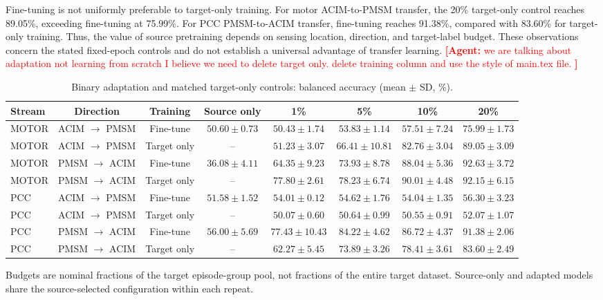 \documentclass[letterpaper,journal]{IEEEtran}
\newcommand{\agent}[1]{%
    \textcolor{red}{\textbf{[Agent:} #1\textbf{]}}%
}
\begin{document}
Fine-tuning is not uniformly preferable to target-only training. For motor ACIM-to-PMSM transfer, the 20\% target-only control reaches 89.05\%, exceeding fine-tuning at 75.99\%. For PCC PMSM-to-ACIM transfer, fine-tuning reaches 91.38\%, compared with 83.60\% for target-only training. Thus, the value of source pretraining depends on sensing location, direction, and target-label budget. These observations concern the stated fixed-epoch controls and do not establish a universal advantage of transfer learning.
\agent{we are talking about adaptation not learning from scratch
I believe we need to delete target only. delete training column and use the style of main.tex file. }
\begin{table}[t]
\centering
\footnotesize
\caption{Binary adaptation and matched target-only controls: balanced accuracy (mean $\pm$ SD, \%).}
\label{tab:domain_adaptation_anomaly2}
\renewcommand{\arraystretch}{1.12}
\setlength{\tabcolsep}{3pt}
\begin{tabular}{lccccccc}
\hline
Stream & Direction & Training & Source only & 1\% & 5\% & 10\% & 20\% \\
\hline
MOTOR & ACIM $\to$ PMSM & Fine-tune & $50.60\pm0.73$ & $50.43\pm1.74$ & $53.83\pm1.14$ & $57.51\pm7.24$ & $75.99\pm1.73$ \\
MOTOR & ACIM $\to$ PMSM & Target only & -- & $51.23\pm3.07$ & $66.41\pm10.81$ & $82.76\pm3.04$ & $89.05\pm3.09$ \\
MOTOR & PMSM $\to$ ACIM & Fine-tune & $36.08\pm4.11$ & $64.35\pm9.23$ & $73.93\pm8.78$ & $88.04\pm5.36$ & $92.63\pm3.72$ \\
MOTOR & PMSM $\to$ ACIM & Target only & -- & $77.80\pm2.61$ & $78.23\pm6.74$ & $90.01\pm4.48$ & $92.15\pm6.15$ \\
PCC & ACIM $\to$ PMSM & Fine-tune & $51.58\pm1.52$ & $54.01\pm0.12$ & $54.62\pm1.76$ & $54.04\pm1.35$ & $56.30\pm3.23$ \\
PCC & ACIM $\to$ PMSM & Target only & -- & $50.07\pm0.60$ & $50.64\pm0.99$ & $50.55\pm0.91$ & $52.07\pm1.07$ \\
PCC & PMSM $\to$ ACIM & Fine-tune & $56.00\pm5.69$ & $77.43\pm10.43$ & $84.22\pm4.62$ & $86.72\pm4.37$ & $91.38\pm2.06$ \\
PCC & PMSM $\to$ ACIM & Target only & -- & $62.27\pm5.45$ & $73.89\pm3.26$ & $78.41\pm3.61$ & $83.60\pm2.49$ \\
\hline
\end{tabular}
\par\smallskip\begin{minipage}{\linewidth}\footnotesize Budgets are nominal fractions of the target episode-group pool, not fractions of the entire target dataset. Source-only and adapted models share the source-selected configuration within each repeat.\end{minipage}
\end{table}
\end{document}
